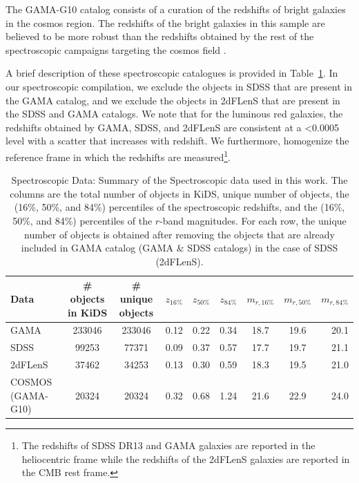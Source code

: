 \documentclass[fleqn,usenatbib,useAMS]{mnras}
\begin{document}
The GAMA-G10 catalog consists of a curation of the redshifts of bright galaxies in the cosmos region. The redshifts of the bright galaxies in this sample are believed to be more robust than the redshifts obtained by the rest of the spectroscopic campaigns targeting the cosmos field \citep[e.g.][]{lily2009}.

A brief description of these spectroscopic catalogues is provided in Table~\ref{tab:zspec}. In our spectroscopic compilation, we exclude the objects in SDSS that are present in the GAMA catalog, and we exclude the objects in 2dFLenS that are present in the SDSS and GAMA catalogs. We note that for the luminous red galaxies, the redshifts obtained by GAMA, SDSS, and 2dFLenS are consistent at a <0.0005 level with a scatter that increases with redshift. We furthermore, homogenize the reference frame in which the redshifts are measured\footnote{The redshifts of SDSS DR13 and GAMA galaxies are reported in the heliocentric frame while the redshifts of the 2dFLenS galaxies are reported in the CMB rest frame.}. 


\begin{table}
	\centering
	\caption{{ Spectroscopic Data: Summary of the Spectroscopic data used in this work. The columns are the total number of objects in KiDS, unique number of objects, the (16\%, 50\%, and 84\%) percentiles of the spectroscopic redshifts, and the (16\%, 50\%, and 84\%) percentiles of the $r$-band magnitudes. For each row, the unique number of objects is obtained after removing the objects that are already included in GAMA catalog (GAMA \& SDSS catalogs) in the case of SDSS (2dFLenS).} 
    }
	\label{tab:zspec}
	\begin{tabularx}{1.95\columnwidth}{lcccccccr} %
		\hline
		Data &  \# objects in KiDS & \# unique objects & $z_{16\%}$ & $z_{50\%}$ & $z_{84\%}$ & $m_{r, 16\%}$ & $m_{r, 50\%}$ & $m_{r, 84\%}$\\
		\hline
		GAMA     & 233046 & 233046 & 0.12  & 0.22 & 0.34 & 18.7 & 19.6 & 20.1  \\
		SDSS     & 99253 &  77371  & 0.09  & 0.37 & 0.57 & 17.7 & 19.7 & 21.1  \\
        2dFLenS  & 37462 &  34253  & 0.13  & 0.30 & 0.59 & 18.3 & 19.5 & 21.0  \\
        COSMOS (GAMA-G10)   & 20324 &  20324  & 0.32 & 0.68 & 1.24 & 21.6 & 22.9 & 24.0 \\
		\hline
	\end{tabularx}
\end{table}
\end{document}
